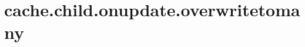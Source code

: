 \section{cache.child.onupdate.overwritetomany}
\label{configuration:CacheChildOnupdateOverwritetomany}
\TODO
